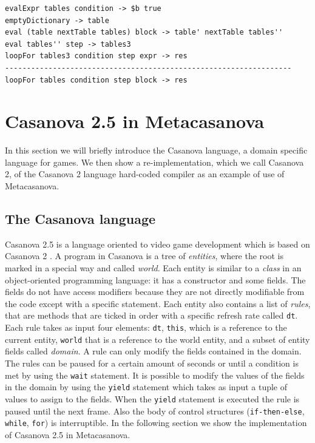 \begin{lstlisting}
evalExpr tables condition -> $b true
emptyDictionary -> table
eval (table nextTable tables) block -> table' nextTable tables''
eval tables'' step -> tables3
loopFor tables3 condition step expr -> res 
------------------------------------------------------------------
loopFor tables condition step block -> res
\end{lstlisting}


\section{Casanova 2.5 in Metacasanova}
In this section we will briefly introduce the Casanova language, a domain specific language for games. We then show a re-implementation, which we call Casanova 2, of the Casanova 2 language hard-coded compiler as an example of use of Metacasanova.


\subsection{The Casanova language}
Casanova 2.5 is a language oriented to video game development which is based on Casanova 2 \cite{CASANOVA2_PAPER}. A program in Casanova is a tree of \textit{entities}, where the root is marked in a special way and called \textit{world}. Each entity is similar to a \textit{class} in an object-oriented programming language: it has a constructor and some fields. The fields do not have access modifiers because they are not directly modifiable from the code except with a specific statement. Each entity also contains a list of \textit{rules}, that are methods that are ticked in order with a specific refresh rate called \texttt{dt}. Each rule takes as input four elements: \texttt{dt}, \texttt{this}, which is a reference to the current entity, \texttt{world} that is a reference to the world entity, and a subset of entity fields called \textit{domain}. A rule can only modify the fields contained in the domain. The rules can be paused for a certain amount of seconds or until a condition is met by using the \texttt{wait} statement. It is possible to modify the values of the fields in the domain by using the \texttt{yield} statement which takes as input a tuple of values to assign to the fields. When the \texttt{yield} statement is executed the rule is paused until the next frame. Also the body of control structures (\texttt{if-then-else}, \texttt{while}, \texttt{for}) is interruptible. In the following section we show the implementation of Casanova 2.5 in Metacasanova.

